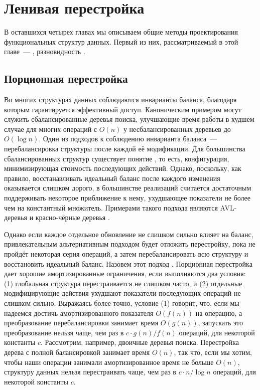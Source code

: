 \chapter{Ленивая перестройка}
\label{ch:8}

В оставшихся четырех главах мы описываем общие методы проектирования
функциональных структур данных.  Первый из них, рассматриваемый в этой
главе~--- , разновидность
 \cite{Overmars1983}.

\section{Порционная перестройка}

Во многих структурах данных соблюдаются инварианты баланса, благодаря
которым гарантируется эффективный доступ. Каноническим примером могут
служить сбалансированные деревья поиска, улучшающие время работы в
худшем случае для многих операций с $O(n)$ у несбалансированных
деревьев до $O(\log n)$. Один из подходов к соблюдению инварианта
баланса~--- перебалансировка структуры после каждой её
модификации. Для большинства сбалансированных структур существует
понятие , то есть,
конфигурация, минимизирующая стоимость последующих действий. Однако,
поскольку, как правило, восстанавливать идеальный баланс после
каждого изменения оказывается слишком дорого, в большинстве реализаций
считается достаточным поддерживать некоторое приближение к нему,
ухудшающее показатели не более чем на константный множитель. Примерами
такого подхода являются AVL-деревья \cite{AdelsonVelskiiLandis1962}
и красно-чёрные деревья \cite{GuibasSedgewick1978}.

Однако если каждое отдельное обновление не слишком сильно влияет на
баланс, привлекательным альтернативным подходом будет отложить
перестройку, пока не пройдёт некоторая серия операций, а затем
перебалансировать всю структуру и восстановить идеальный
баланс. Назовем этот подход . Порционная перестройка дает хорошие амортизированные
ограничения, если выполняются два условия: (1) глобальная структура
перестраивается не слишком часто, и (2) отдельные модифицирующие
действия ухудшают показатели последующих операций не слишком
сильно. Выражаясь более точно, условие (1) говорит, что, если мы
надеемся достичь амортизированного показателя $O(f(n))$ на операцию, а
преобразование перебалансировки занимает время $O(g(n))$, запускать
это преобразование нельзя чаще, чем раз в $c \cdot g(n) / f(n)$
операций, для некоторой константы $c$. Рассмотрим, например, двоичные
деревья поиска. Перестройка дерева с полной балансировкой занимает
время $O(n)$, так что, если мы хотим, чтобы наши операции занимали
амортизированное время не больше $O(n)$, структуру данных нельзя
перестраивать чаще, чем раз в $c \cdot n / \log n$ операций, для
некоторой константы $c$.

